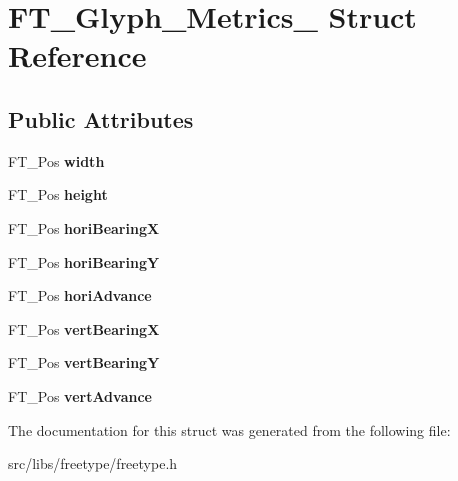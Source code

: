 \hypertarget{struct_f_t___glyph___metrics__}{
\section{FT\_\-Glyph\_\-Metrics\_\- Struct Reference}
\label{struct_f_t___glyph___metrics__}
}
\subsection*{Public Attributes}
\begin{DoxyCompactItemize}
\item 
\hypertarget{struct_f_t___glyph___metrics___a0ff1be869e6a28d1f2990b0e5719dca9}{
FT\_\-Pos {\bfseries width}}
\label{struct_f_t___glyph___metrics___a0ff1be869e6a28d1f2990b0e5719dca9}

\item 
\hypertarget{struct_f_t___glyph___metrics___aa2a76ec448ec9d18acf343f01b77cb21}{
FT\_\-Pos {\bfseries height}}
\label{struct_f_t___glyph___metrics___aa2a76ec448ec9d18acf343f01b77cb21}

\item 
\hypertarget{struct_f_t___glyph___metrics___a2afc877f52c8a8910ec144a1948186cc}{
FT\_\-Pos {\bfseries horiBearingX}}
\label{struct_f_t___glyph___metrics___a2afc877f52c8a8910ec144a1948186cc}

\item 
\hypertarget{struct_f_t___glyph___metrics___afd97c10d43ed1f66598a18884468b536}{
FT\_\-Pos {\bfseries horiBearingY}}
\label{struct_f_t___glyph___metrics___afd97c10d43ed1f66598a18884468b536}

\item 
\hypertarget{struct_f_t___glyph___metrics___af12db260a90b8a7c938ad48ebf20ccbe}{
FT\_\-Pos {\bfseries horiAdvance}}
\label{struct_f_t___glyph___metrics___af12db260a90b8a7c938ad48ebf20ccbe}

\item 
\hypertarget{struct_f_t___glyph___metrics___aead5c5637b983b811738bff3bcea8cea}{
FT\_\-Pos {\bfseries vertBearingX}}
\label{struct_f_t___glyph___metrics___aead5c5637b983b811738bff3bcea8cea}

\item 
\hypertarget{struct_f_t___glyph___metrics___a7f1aba91b86fddeb11030eab15dcce08}{
FT\_\-Pos {\bfseries vertBearingY}}
\label{struct_f_t___glyph___metrics___a7f1aba91b86fddeb11030eab15dcce08}

\item 
\hypertarget{struct_f_t___glyph___metrics___a594f43c64fe5c12a399a0f0a47c04990}{
FT\_\-Pos {\bfseries vertAdvance}}
\label{struct_f_t___glyph___metrics___a594f43c64fe5c12a399a0f0a47c04990}

\end{DoxyCompactItemize}


The documentation for this struct was generated from the following file:\begin{DoxyCompactItemize}
\item 
src/libs/freetype/freetype.h\end{DoxyCompactItemize}
